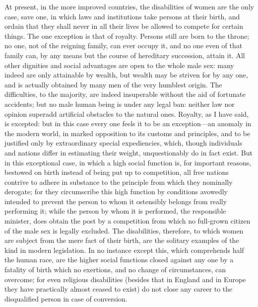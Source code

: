 \documentclass[12pt]{report}
\begin{document}
At present, in the more improved countries, the disabilities of women are the only case, save one, in which laws and institutions take persons at their birth, and ordain that they shall never in all their lives be allowed to compete for certain things. The one exception is that of royalty. Persons still are born to the throne; no one, not of the reigning family, can ever occupy it, and no one even of that family can, by any means but the course of hereditary succession, attain it. All other dignities and social advantages are open to the whole male sex: many indeed are only attainable by wealth, but wealth may be striven for by any one, and is actually obtained by many men of the very humblest origin. The difficulties, to the majority, are indeed insuperable without the aid of fortunate accidents; but no male human being is under any legal ban: neither law nor opinion superadd artificial obstacles to the natural ones. Royalty, as I have said, is excepted: but in this case every one feels it to be an exception—an anomaly in the modern world, in marked opposition to its customs and principles, and to be justified only by extraordinary special expediencies, which, though individuals and nations differ in estimating their weight, unquestionably do in fact exist. But in this exceptional case, in which a high social function is, for important reasons, bestowed on birth instead of being put up to competition, all free nations contrive to adhere in substance to the principle from which they nominally derogate; for they circumscribe this high function by conditions avowedly intended to prevent the person to whom it ostensibly belongs from really performing it; while the person by whom it is performed, the responsible minister, does obtain the post by a competition from which no full-grown citizen of the male sex is legally excluded. The disabilities, therefore, to which women are subject from the mere fact of their birth, are the solitary examples of the kind in modern legislation. In no instance except this, which comprehends half the human race, are the higher social functions closed against any one by a fatality of birth which no exertions, and no change of circumstances, can overcome; for even religious disabilities (besides that in England and in Europe they have practically almost ceased to exist) do not close any career to the disqualified person in case of conversion.
\end{document}
